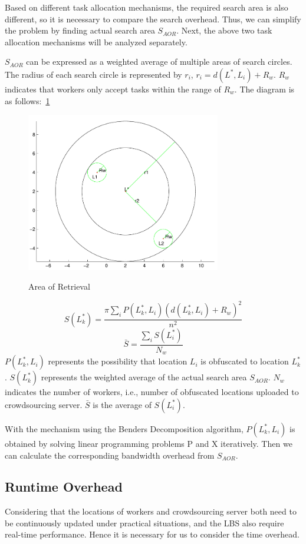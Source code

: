 Based on different task allocation mechanisms, the required search area is also different, so it is necessary to compare the search overhead. Thus, we can simplify the problem by finding actual search area $S_{AOR}$. Next, the above two task allocation mechanisms will be analyzed separately.

$S_{AOR}$ can be expressed as a weighted average of multiple areas of search circles. The radius of each search circle is represented by $r_i$, $r_i=d(L^*,L_i)+R_w$. $R_w$ indicates that workers only accept tasks within the range of $R_w$. The diagram is as follows:~\ref{img:AOR}

\begin{figure}
\includegraphics[width=8.5cm]{AOR}
\label{img:AOR}
\caption{Area of Retrieval}
\end{figure}

$$
	S(L^*_k)=\frac{\pi \sum_i P(L^*_k,L_i)(d(L^*_k,L_i)+R_w)^2}{n^2}
$$
$$
	\bar{S}=\frac{\sum_i S(L^*_i)}{N_w}
$$
$P(L^*_k,L_i)$ represents the possibility that location $L_i$ is obfuscated to location $L^*_k$. $S(L^*_k)$ represents the weighted average of the actual search area $S_{AOR}$. $N_w$ indicates the number of workers, i.e., number of obfuscated locations uploaded to crowdsourcing server. $\bar{S}$ is the average of $S(L^*_i)$. 

With the mechanism using the Benders Decomposition algorithm, $P(L^*_k,L_i)$ is obtained by solving linear programming problems P and X iteratively. Then we can calculate the corresponding bandwidth overhead from $S_{AOR}$. 

\subsection{Runtime Overhead}
Considering that the locations of workers and crowdsourcing server both need to be continuously updated under practical situations, and the LBS also require real-time performance. Hence it is necessary for us to consider the time overhead.

